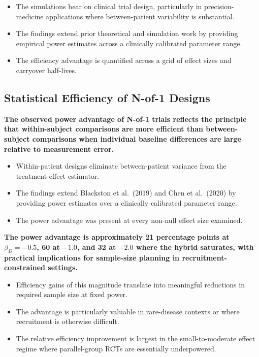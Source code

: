\documentclass[
  11pt,
]{article}
\begin{document}
\begin{itemize}\setlength{\itemsep}{2pt}\setlength{\parskip}{0pt}
\item The simulations bear on clinical trial design, particularly in precision-medicine applications where between-patient variability is substantial.
\item The findings extend prior theoretical and simulation work by providing empirical power estimates across a clinically calibrated parameter range.
\item The efficiency advantage is quantified across a grid of effect sizes and carryover half-lives.
\end{itemize}

\subsection{Statistical Efficiency of N-of-1 Designs}\label{statistical-efficiency-of-n-of-1-designs}

\textbf{The observed power advantage of N-of-1 trials reflects the principle that within-subject comparisons are more efficient than between-subject comparisons when individual baseline differences are large relative to measurement error.}

\begin{itemize}\setlength{\itemsep}{2pt}\setlength{\parskip}{0pt}
\item Within-patient designs eliminate between-patient variance from the treatment-effect estimator.
\item The findings extend Blackston et al.\ (2019) and Chen et al.\ (2020) by providing power estimates over a clinically calibrated parameter range.
\item The power advantage was present at every non-null effect size examined.
\end{itemize}

\textbf{The power advantage is approximately 21 percentage points at $\beta_D = -0.5$, 60 at $-1.0$, and 32 at $-2.0$ where the hybrid saturates, with practical implications for sample-size planning in recruitment-constrained settings.}

\begin{itemize}\setlength{\itemsep}{2pt}\setlength{\parskip}{0pt}
\item Efficiency gains of this magnitude translate into meaningful reductions in required sample size at fixed power.
\item The advantage is particularly valuable in rare-disease contexts or where recruitment is otherwise difficult.
\item The relative efficiency improvement is largest in the small-to-moderate effect regime where parallel-group RCTs are essentially underpowered.
\end{itemize}
\end{document}
